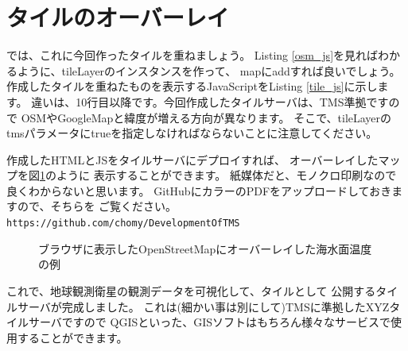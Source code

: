 \section*{タイルのオーバーレイ}
      
では、これに今回作ったタイルを重ねましょう。
Listing \ref{osm_js}を見ればわかるように、tileLayerのインスタンスを作って、
mapにaddすれば良いでしょう。作成したタイルを重ねたものを表示するJavaScriptをListing \ref{tile_js}に示します。
違いは、10行目以降です。今回作成したタイルサーバは、TMS準拠ですので
OSMやGoogleMapと緯度が増える方向が異なります。
そこで、tileLayerのtmsパラメータにtrueを指定しなければならないことに注意してください。



作成したHTMLとJSをタイルサーバにデプロイすれば、
オーバーレイしたマップを図\ref{fig:browser}のように
表示することができます。
紙媒体だと、モノクロ印刷なので良くわからないと思います。
GitHubにカラーのPDFをアップロードしておきますので、そちらを
ご覧ください。
\texttt{https://github.com/chomy/DevelopmentOfTMS}

\begin{figure}[t]
\centering
{}
\caption{ブラウザに表示したOpenStreetMapにオーバーレイした海水面温度の例}
\label{fig:browser}
\end{figure}


これで、地球観測衛星の観測データを可視化して、タイルとして
公開するタイルサーバが完成しました。
これは(細かい事は別にして)TMSに準拠したXYZタイルサーバですので
QGISといった、GISソフトはもちろん様々なサービスで使用することができます。
